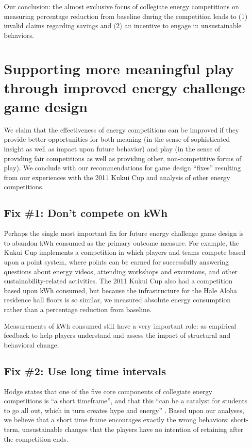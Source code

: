 \documentclass[jou]{apa} %
\begin{document}
Our conclusion: the almost exclusive focus of collegiate energy competitions on measuring
percentage reduction from baseline during the competition leads to (1) invalid claims
regarding savings and (2) an incentive to engage in unsustainable behaviors.

\section{Supporting more meaningful play through improved energy challenge game design}

We claim that the effectiveness of energy competitions can be improved if they provide
better opportunities for both meaning (in the sense of sophisticated insight as well as
impact upon future behavior) and play (in the sense of providing fair competitions as well
as providing other, non-competitive forms of play). We conclude with our recommendations
for game design ``fixes'' resulting from our experiences with the 2011 Kukui Cup and
analysis of other energy competitions.

\subsection{Fix \#1: Don't compete on kWh}

Perhaps the single most important fix for future energy challenge game design is to abandon
kWh consumed as the primary outcome measure.  For example, the Kukui Cup implements a
competition in which players and teams compete based upon a point system, where points can
be earned for successfully answering questions about energy videos, attending workshops
and excursions, and other sustainability-related activities.  The 2011 Kukui Cup also had
a competition based upon kWh consumed, but because the infrastructure for the Hale Aloha
residence hall floors is so similar, we measured absolute energy consumption rather than a
percentage reduction from baseline.

Measurements of kWh consumed still have a very important role: as empirical feedback to
help players understand and assess the impact of structural and behavioral change.  

\subsection{Fix \#2: Use long time intervals}

Hodge states that one of the five core components of collegiate energy competitions is
``a short timeframe'', and that this ``can be a catalyst for students to go all out, which
in turn creates hype and energy'' \cite{Hodge2010}.   Based upon our analyses, we believe
that a short time frame encourages exactly the wrong behaviors:  short-term, unsustainable
changes that the players have no intention of retaining after the competition ends.  
\end{document}
